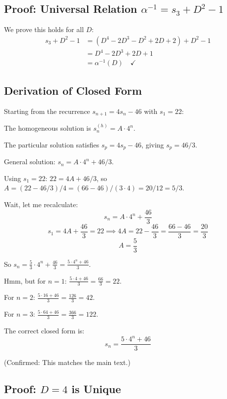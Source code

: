 \documentclass[12pt,a4paper]{article}
\begin{document}
\subsection{Proof: Universal Relation $\alpha^{-1} = s_3 + D^2 - 1$}

We prove this holds for all $D$:
\begin{align}
s_3 + D^2 - 1 &= (D^4 - 2D^3 - D^2 + 2D + 2) + D^2 - 1 \nonumber\\
&= D^4 - 2D^3 + 2D + 1 \nonumber\\
&= \alpha^{-1}(D) \quad \checkmark
\end{align}

\subsection{Derivation of Closed Form}

Starting from the recurrence $s_{n+1} = 4s_n - 46$ with $s_1 = 22$:

The homogeneous solution is $s_n^{(h)} = A \cdot 4^n$.

The particular solution satisfies $s_p = 4s_p - 46$, giving $s_p = 46/3$.

General solution: $s_n = A \cdot 4^n + 46/3$.

Using $s_1 = 22$: $22 = 4A + 46/3$, so $A = (22 - 46/3)/4 = (66-46)/(3\cdot4) = 20/12 = 5/3$.

Wait, let me recalculate:
\[
s_n = A \cdot 4^n + \frac{46}{3}
\]
\[
s_1 = 4A + \frac{46}{3} = 22 \implies 4A = 22 - \frac{46}{3} = \frac{66-46}{3} = \frac{20}{3}
\]
\[
A = \frac{5}{3}
\]

So $s_n = \frac{5}{3} \cdot 4^n + \frac{46}{3} = \frac{5 \cdot 4^n + 46}{3}$.

Hmm, but for $n=1$: $\frac{5 \cdot 4 + 46}{3} = \frac{66}{3} = 22$. \checkmark

For $n=2$: $\frac{5 \cdot 16 + 46}{3} = \frac{126}{3} = 42$. \checkmark

For $n=3$: $\frac{5 \cdot 64 + 46}{3} = \frac{366}{3} = 122$. \checkmark

The correct closed form is:
\begin{equation}
\boxed{s_n = \frac{5 \cdot 4^n + 46}{3}}
\end{equation}

(Confirmed: This matches the main text.)

\subsection{Proof: $D=4$ is Unique}
\end{document}
